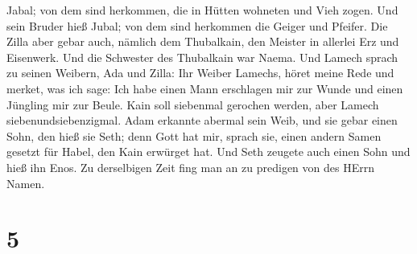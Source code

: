 Jabal; von dem sind herkommen, die in Hütten wohneten und Vieh zogen.
 Und sein Bruder hieß Jubal; von dem sind herkommen die
Geiger und Pfeifer.  Die Zilla aber gebar auch, nämlich dem
Thubalkain, den Meister in allerlei Erz und Eisenwerk. Und die Schwester
des Thubalkain war Naema.  Und Lamech sprach zu seinen
Weibern, Ada und Zilla: Ihr Weiber Lamechs, höret meine Rede und merket,
was ich sage: Ich habe einen Mann erschlagen mir zur Wunde und einen
Jüngling mir zur Beule.  Kain soll siebenmal gerochen
werden, aber Lamech siebenundsiebenzigmal.  Adam erkannte
abermal sein Weib, und sie gebar einen Sohn, den hieß sie Seth; denn
Gott hat mir, sprach sie, einen andern Samen gesetzt für Habel, den Kain
erwürget hat.  Und Seth zeugete auch einen Sohn und hieß
ihn Enos. Zu derselbigen Zeit fing man an zu predigen von des HErrn
Namen.

\hypertarget{section-4}{%
\section{5}\label{section-4}}

